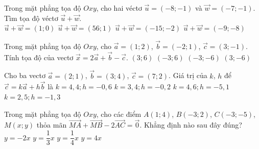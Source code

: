 \begin{ex}
	Trong mặt phẳng tọa độ ${Oxy}$, cho hai véctơ $\overrightarrow{u}=(-8;-1)$ và $\overrightarrow{w}=(-7;-1)$. Tìm tọa độ véctơ ${\overrightarrow{u}+\overrightarrow{w}}$.\\ 
	\choice
	{ ${\overrightarrow{u}+\overrightarrow{w}=(1;0)}$ }
	{ ${\overrightarrow{u}+\overrightarrow{w}=(56;1)}$ }
	{ \True ${\overrightarrow{u}+\overrightarrow{w}= (-15;-2)}$ }
	{ ${\overrightarrow{u}+\overrightarrow{w}=(-9;-8)}$ }
	\end{ex}

\begin{ex}%
	Trong mặt phẳng tọa độ $Oxy$, cho $\overrightarrow{a}=(1;2)$, $\overrightarrow{b}=(-2;1)$, $\overrightarrow{c}=(3;-1)$. Tính tọa độ của vectơ $\overrightarrow{x}=2\overrightarrow{a}+\overrightarrow{b}-\overrightarrow{c}$.
	\choice
	{$(3;6)$}
	{\True $(-3;6)$}
	{$(-3;-6)$}
	{$(3;-6)$}
\end{ex}

\begin{ex}%
	Cho ba vectơ $\overrightarrow{a}=(2;1)$, $\overrightarrow{b}=(3;4)$, $\overrightarrow{c}=(7;2)$. Giá trị của $k$, $h$ để $\overrightarrow{c}=k\overrightarrow{a}+h\overrightarrow{b}$ là
	\haicot
	{\True $k=4{,}4;h=-0{,}6$}
	{$k=3{,4};h=-0{,}2$}
	{$k=4{,}6; h=-5{,}1$}
	{$k=2{,}5;h=-1{,}3$}
\end{ex}


\begin{ex}%
	Trong mặt phẳng tọa độ $Oxy$, cho các điểm $A(1;4)$, $B(-3;2)$, $C(-3;-5)$, $M(x;y)$ thỏa mãn $\overrightarrow{MA}+\overrightarrow{MB}-2\overrightarrow{AC}=\overrightarrow{0}$. Khẳng định nào sau đây đúng?
	\choice
	{$y=-2x$}
	{$y=\dfrac{1}{3}x$}
	{$y=\dfrac{1}{4}x$}
	{\True $y=4x$}
\end{ex}

